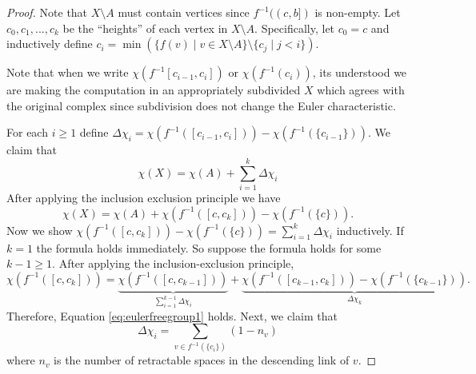 \begin{proof}
    Note that \(X \setminus A\) must contain vertices since \(f^{-1}((c, b])\) is non-empty.
    Let \(c_0, c_1, ..., c_k\) be the ``heights'' of each vertex in \(X \setminus A\).
    Specifically, let \(c_0 = c\) and 
    inductively define \(c_i = \min\left(\{f(v) \mid v \in X \setminus A\}\setminus\{c_j \mid j < i\}\right)\).
    
    Note that when we write \(\chi(f^{-1}[c_{i-1}, c_i])\) or \(\chi(f^{-1}(c_i))\), 
    its understood we are making the computation in an appropriately subdivided \(X\) 
    which agrees with the original complex since subdivision does not change the Euler characteristic.

    For each \(i \ge 1\) define \(\Delta \chi_i = \chi(f^{-1}([c_{i-1}, c_i])) - \chi(f^{-1}(\{c_{i-1}\}))\).
    We claim that 
    \begin{equation}
     \label{eq:eulerfreegroup1}   
        \chi(X) = \chi(A) + \sum_{i=1}^k \Delta \chi_i
    \end{equation}
    After applying the inclusion exclusion principle we have
    \[
    \chi(X) = \chi(A) + \chi(f^{-1}([c, c_k])) - \chi(f^{-1}(\{c\})).
    \]
    Now we show \(\chi(f^{-1}([c, c_k])) - \chi(f^{-1}(\{c\})) = \sum_{i=1}^k \Delta \chi_i\) inductively.
    If \(k = 1\) the formula holds immediately. So suppose the formula holds for some \(k - 1 \ge 1\).
    After applying the inclusion-exclusion principle,
    \[
    \chi(f^{-1}([c, c_k])) = \underbrace{\chi(f^{-1}([c, c_{k-1}]))}_{\sum_{i=1}^{k-1}\Delta \chi_i} + \underbrace{\chi(f^{-1}([c_{k-1}, c_k])) - \chi(f^{-1}(\{c_{k-1}\}))}_{\Delta \chi_k}.
    \]
    Therefore, Equation \ref{eq:eulerfreegroup1} holds. Next, we claim that
    \begin{equation}
     \label{eq:eulerfreegroup2}   
        \Delta \chi_i = \sum_{v \in f^{-1}(\{c_i\})} (1 - n_v)
    \end{equation}
    where \(n_v\) is the number of retractable spaces in the descending link of \(v\).
    

\end{proof}
